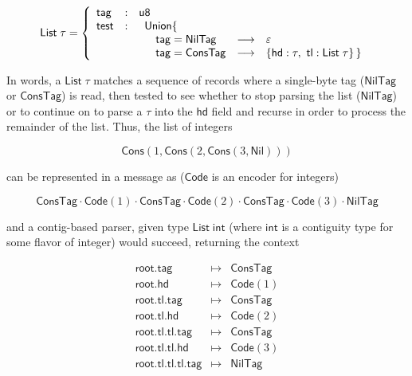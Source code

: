 \documentclass{article}
\newcommand{\konst}[1]{\ensuremath{\mathsf{#1}}}
\theoremstyle{definition}
\begin{document}
\[
 \konst{List}\;\tau =
   \left\{
     \begin{array}{lcl}
       \konst{tag} & : & \konst{u8} \\
       \konst{test} & : &
       \begin{array}[t] {lcl}
         \konst{Union} \{ \\
         \quad \konst{tag} = \konst{NilTag} & \longrightarrow & \varepsilon \\
         \quad \konst{tag} = \konst{ConsTag} & \longrightarrow &
          \{ \konst{hd} : \tau, \ \konst{tl} : \konst{List}\; \tau \} \, \}
        \end{array}
     \end{array}
   \right.
\]

In words, a $\konst{List}\;\tau$ matches a sequence of records where
a single-byte tag (\konst{NilTag} or \konst{ConsTag}) is read, then tested to see
whether to stop parsing the list (\konst{NilTag}) or to continue on to
parse a $\tau$ into the \konst{hd} field and recurse in order to
process the remainder of the list. Thus, the list of integers

\[ \konst{Cons}(1, \konst{Cons}(2, \konst{Cons}(3, \konst{Nil}))) \]

can be represented in a message as (\konst{Code} is an encoder for integers)

\[ \konst{ConsTag}\cdot \konst{Code}(1) \cdot
   \konst{ConsTag}\cdot \konst{Code}(2) \cdot
   \konst{ConsTag}\cdot \konst{Code}(3) \cdot \konst{NilTag} \]

and a contig-based parser, given type $\konst{List}\; \konst{int}$
(where $\konst{int}$ is a contiguity type for some flavor of integer)
would succeed, returning the context

\[
\begin{array}{rcl}
\konst{root.tag} & \mapsto & \konst{ConsTag} \\
\konst{root.hd} & \mapsto & \konst{Code}(1) \\
\konst{root.tl.tag} & \mapsto & \konst{ConsTag} \\
\konst{root.tl.hd} & \mapsto & \konst{Code}(2) \\
\konst{root.tl.tl.tag} & \mapsto & \konst{ConsTag} \\
\konst{root.tl.tl.hd} & \mapsto & \konst{Code}(3) \\
\konst{root.tl.tl.tl.tag} & \mapsto & \konst{NilTag}
\end{array}
\]
\end{document}

